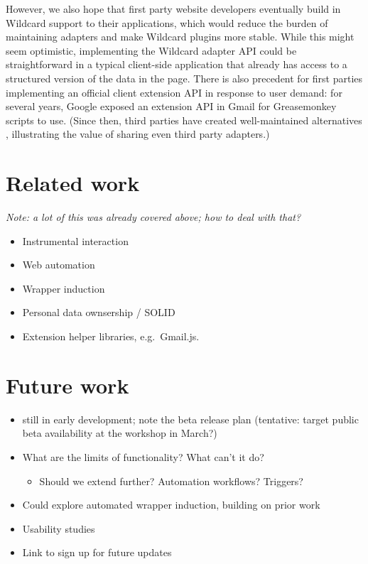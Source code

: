 \documentclass[english,submission]{programming}
\providecommand{\tightlist}{%
  \setlength{\itemsep}{0pt}\setlength{\parskip}{0pt}}
\begin{document}
However, we also hope that first party website developers eventually
build in Wildcard support to their applications, which would reduce the
burden of maintaining adapters and make Wildcard plugins more stable.
While this might seem optimistic, implementing the Wildcard adapter API
could be straightforward in a typical client-side application that
already has access to a structured version of the data in the page.
There is also precedent for first parties implementing an official
client extension API in response to user demand: for several years,
Google exposed an extension API in Gmail for Greasemonkey scripts to
use. (Since then, third parties have created well-maintained
alternatives \autocite{streak,talwar2019}, illustrating the value of
sharing even third party adapters.)

\hypertarget{related-work}{%
\section{Related work}\label{related-work}}

\emph{Note: a lot of this was already covered above; how to deal with
that?}

\begin{itemize}
\tightlist
\item
  Instrumental interaction
\item
  Web automation
\item
  Wrapper induction
\item
  Personal data ownsership / SOLID
\item
  Extension helper libraries, e.g.~Gmail.js.
\end{itemize}

\hypertarget{future-work}{%
\section{Future work}\label{future-work}}

\begin{itemize}
\tightlist
\item
  still in early development; note the beta release plan (tentative:
  target public beta availability at the workshop in March?)
\item
  What are the limits of functionality? What can't it do?

  \begin{itemize}
  \tightlist
  \item
    Should we extend further? Automation workflows? Triggers?
  \end{itemize}
\item
  Could explore automated wrapper induction, building on prior work
\item
  Usability studies
\item
  Link to sign up for future updates
\end{itemize}

\acks
\printbibliography
\end{document}
